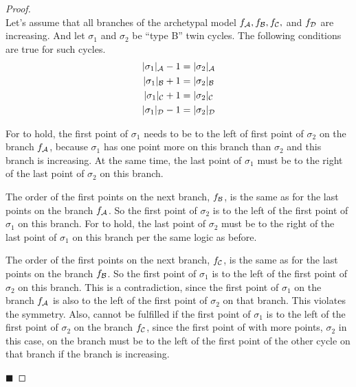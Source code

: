 \begin{proof} \phantom{x} \\
	Let's assume that all branches of the archetypal model $f_{\mathcal{A}}, f_{\mathcal{B}}, f_{\mathcal{C}},$ and $f_{\mathcal{D}}$ are increasing.
	And let $\sigma_1$ and $\sigma_2$ be ``type B'' twin cycles.
	The following conditions are true for such cycles.
	\begin{subequations}
		\begin{align}
			|\sigma_1|_{\mathcal{A}} - 1 & = |\sigma_2|_{\mathcal{A}} \label{equ:add.change.conseq.sigmaA} \\
			|\sigma_1|_{\mathcal{B}} + 1 & = |\sigma_2|_{\mathcal{B}} \label{equ:add.change.conseq.sigmaB} \\
			|\sigma_1|_{\mathcal{C}} + 1 & = |\sigma_2|_{\mathcal{C}} \label{equ:add.change.conseq.sigmaC} \\
			|\sigma_1|_{\mathcal{D}} - 1 & = |\sigma_2|_{\mathcal{D}} \label{equ:add.change.conseq.sigmaD}
		\end{align}
	\end{subequations}

	For  to hold, the first point of  $\sigma_1$ needs to be to the left of first point of  $\sigma_2$ on the branch $f_{\mathcal{A}}$, because  $\sigma_1$ has one point more on this branch than  $\sigma_2$ and this branch is increasing.
	At the same time, the last point of  $\sigma_1$ must be to the right of the last point of  $\sigma_2$ on this branch.

	The order of the first points on the next branch, $f_{\mathcal{B}}$, is the same as for the last points on the branch $f_{\mathcal{A}}$.
	So the first point of  $\sigma_2$ is to the left of the first point of  $\sigma_1$ on this branch.
	For  to hold, the last point of  $\sigma_2$ must be to the right of the last point of  $\sigma_1$ on this branch per the same logic as before.

	The order of the first points on the next branch, $f_{\mathcal{C}}$, is the same as for the last points on the branch $f_{\mathcal{B}}$.
	So the first point of  $\sigma_1$ is to the left of the first point of  $\sigma_2$ on this branch.
	This is a contradiction, since the first point of  $\sigma_1$ on the branch $f_{\mathcal{A}}$ is also to the left of the first point of  $\sigma_2$ on that branch.
	This violates the symmetry.
	Also,  cannot be fulfilled if the first point of  $\sigma_1$ is to the left of the first point of  $\sigma_2$ on the branch $f_{\mathcal{C}}$, since the first point of  with more points, $\sigma_2$ in this case, on the branch must be to the left of the first point of the other cycle on that branch if the branch is increasing.

	\hfill $\blacksquare$
\end{proof}
